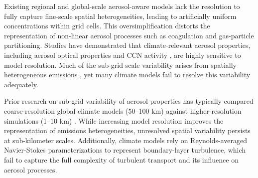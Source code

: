 \documentclass[journal abbreviation, manuscript]{copernicus}
\begin{document}
Existing regional and global-scale aerosol-aware models lack the
resolution to fully capture fine-scale spatial heterogeneities,
leading to artificially uniform concentrations within grid cells. This
oversimplification distorts the representation of non-linear aerosol
processes such as coagulation and gas-particle partitioning. Studies
have demonstrated that climate-relevant aerosol properties, including
aerosol optical properties \citep{gustafson_jr_downscaling_2011} and
CCN activity \citep{weigum_effect_2016}, are highly sensitive to model
resolution. Much of the sub-grid scale variability arises from
spatially heterogeneous emissions \citep{qian_investigation_2010}, yet
many climate models fail to resolve this variability adequately.

Prior research on sub-grid variability of aerosol properties has
typically compared coarse-resolution global climate models (50--100 km)
against higher-resolution simulations (1--10 km)
\citep{qian_investigation_2010, gustafson_jr_downscaling_2011,
  weigum_effect_2016, crippa_impact_2017,
  lin_quantification_2017}. While increasing model resolution improves
the representation of emissions heterogeneities, unresolved spatial
variability persists at sub-kilometer scales. Additionally,
climate models rely on Reynolds-averaged Navier-Stokes
parameterizations to represent boundary-layer turbulence, which fail
to capture the full complexity of turbulent transport and its
influence on aerosol processes.
\end{document}
